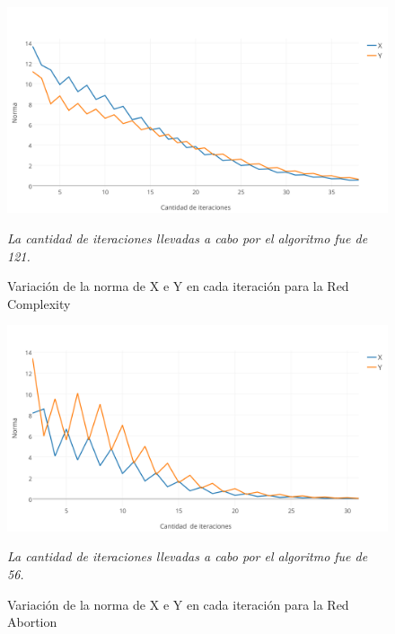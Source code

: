 \documentclass[a4paper]{article}
\begin{document}
\begin{figure}[h!]
  \begin{center}
	\includegraphics[scale=0.50]{imagenes/exp12/complexityHITS.png}
	\caption{Variaci\'on de la norma de X e Y en cada iteraci\'on para la Red Complexity}
	\label{nombreparareferenciar}
	\textit{La cantidad de iteraciones llevadas a cabo por el algoritmo fue de 121.}
  \end{center}
\end{figure}
\newpage
\begin{figure}[h!]
  \begin{center}
	\includegraphics[scale=0.50]{imagenes/exp12/abortionHITS.png}
	\caption{Variaci\'on de la norma de X e Y en cada iteraci\'on para la Red Abortion}
	\label{nombreparareferenciar}
	\textit{La cantidad de iteraciones llevadas a cabo por el algoritmo fue de 56.}
  \end{center}
\end{figure}
\end{document}
